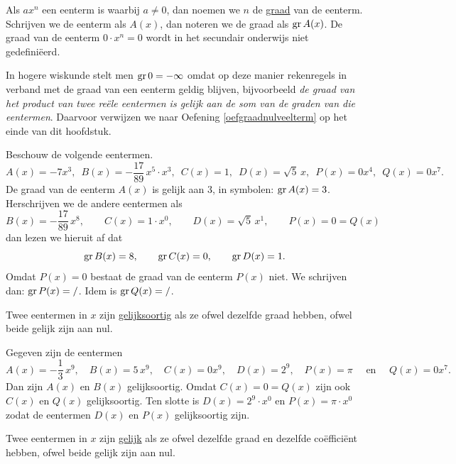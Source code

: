 \documentclass{ximera}
\begin{document}
Als $ax^n$ een eenterm is waarbij $a \neq 0$, dan noemen we $n$ de \underline{graad} van de eenterm. Schrijven we de eenterm als $A(x)$, dan noteren we de graad als $\operatorname{gr} A(x)$. De graad van de eenterm $0\cdot x^n = 0$ wordt in het secundair onderwijs niet gedefini\"eerd.

\medskip

\begin{Uitbreiding}
In hogere wiskunde stelt men $\operatorname{gr} 0 = - \infty$ omdat op deze manier rekenregels in verband met de graad van een eenterm geldig blijven, bijvoorbeeld 
{\em de graad van het product van twee re\"ele eentermen is gelijk aan de som van de graden van die eentermen}. Daarvoor verwijzen we naar Oefening \ref{oefgraadnulveelterm} op het einde van dit hoofdstuk.
\end{Uitbreiding}

\begin{voorbeeld}
Beschouw de volgende eentermen.
\[
A(x) = -7x^3, \,\,\, B(x) = -\frac{17}{89}\,x^5\cdot x^3, \,\,\, C(x) = 1, \,\,\, D(x) = \sqrt{5}\,x, \,\,\, P(x) = 0 x^4, \,\,\,  Q(x) = 0 x^7.
\]
De graad van de eenterm $A(x)$ is gelijk aan $3$, in symbolen: $\operatorname{gr} A(x) = 3$. Herschrijven we de andere eentermen als
\[
B(x) = -\frac{17}{89}\,x^8, \qquad C(x) = 1\cdot x^0, \qquad D(x) = \sqrt{5}\,x^1, \qquad P(x) = 0 = Q(x)
\]
dan lezen we hieruit af dat 
\[
\operatorname{gr} B(x) = 8, \qquad \operatorname{gr} C(x) = 0, \qquad \operatorname{gr} D(x) = 1. 
\]
Omdat $P(x) = 0$ bestaat de graad van de eenterm $P(x)$ niet. We schrijven dan: $\operatorname{gr} P(x) = /$. Idem is $\operatorname{gr} Q(x) = /$.
\end{voorbeeld}

Twee eentermen in $x$ zijn \underline{gelijksoortig} als ze ofwel dezelfde graad hebben, ofwel beide gelijk zijn aan nul.

\begin{voorbeeld}
Gegeven zijn de eentermen
\[
A(x) = -\frac{1}{3}\,x^9, \quad B(x) = 5\,x^9, \quad C(x) = 0x^9, \quad D(x) = 2^9, \quad P(x) = \pi \quad \text{ en } \quad Q(x) = 0 x^7.
\]
Dan zijn $A(x)$ en $B(x)$ gelijksoortig. Omdat $C(x) = 0 = Q(x)$ zijn ook $C(x)$ en $Q(x)$ gelijksoortig. Ten slotte is $D(x) = 2^9 \cdot x^0$ en $P(x) = \pi \cdot x^0$ zodat de eentermen $D(x)$ en $P(x)$ gelijksoortig zijn.  
\end{voorbeeld}

Twee eentermen in $x$ zijn \underline{gelijk} als ze ofwel dezelfde graad en dezelfde co\"effici\"ent hebben, ofwel beide gelijk zijn aan nul.
\end{document}

